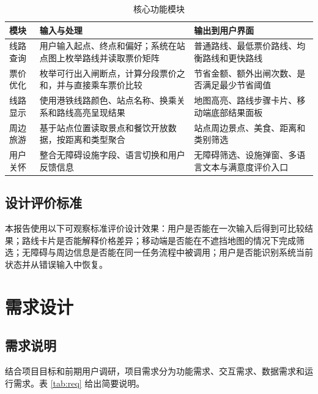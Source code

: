 \documentclass[UTF8,a4paper,11pt]{ctexart}
\begin{document}
\begin{table}[H]
  \centering
  \caption{核心功能模块}
  \begin{tabularx}{\textwidth}{p{}YY}
    \toprule
    模块 & 输入与处理 & 输出到用户界面 \\
    \midrule
    线路查询 & 用户输入起点、终点和偏好；系统在站点图上枚举路线并读取票价矩阵 & 普通路线、最低票价路线、均衡路线和更快路线 \\
    票价优化 & 枚举可行出入闸断点，计算分段票价之和，并与直接乘车票价比较 & 节省金额、额外出闸次数、是否满足最少节省阈值 \\
    线路显示 & 使用港铁线路颜色、站点名称、换乘关系和路线高亮呈现结果 & 地图高亮、路线步骤卡片、移动端底部结果面板 \\
    周边旅游 & 基于站点位置读取景点和餐饮开放数据，按距离和类型聚合 & 站点周边景点、美食、距离和类别筛选 \\
    用户关怀 & 整合无障碍设施字段、语言切换和用户反馈信息 & 无障碍筛选、设施弹窗、多语言文本与满意度评价入口 \\
    \bottomrule
  \end{tabularx}
\end{table}

\subsection{设计评价标准}

本报告使用以下可观察标准评价设计效果：用户是否能在一次输入后得到可比较结果；路线卡片是否能解释价格差异；移动端是否能在不遮挡地图的情况下完成筛选；无障碍与周边信息是否能在同一任务流程中被调用；用户是否能识别系统当前状态并从错误输入中恢复。

\section{需求设计}

\subsection{需求说明}

结合项目目标和前期用户调研，项目需求分为功能需求、交互需求、数据需求和运行需求。表 \ref{tab:req} 给出简要说明。
\end{document}
